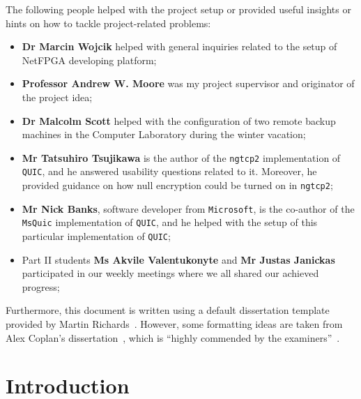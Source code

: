 \documentclass[12pt,a4paper,twoside,openright]{report}
\begin{document}
The following people helped with the project setup or provided useful insights or hints on how to tackle project-related problems:
\begin{itemize}
    \item \textbf{Dr Marcin Wojcik} helped with general inquiries related to the setup of NetFPGA developing platform;
    \item \textbf{Professor Andrew W. Moore} was my project supervisor and originator of the project idea;
    \item \textbf{Dr Malcolm Scott} helped with the configuration of two remote backup machines in the Computer Laboratory during the winter vacation;
    \item \textbf{Mr Tatsuhiro Tsujikawa} is the author of the \texttt{ngtcp2} implementation of \texttt{QUIC}, and he answered usability questions related to it. Moreover, he provided guidance on how null encryption could be turned on in \texttt{ngtcp2};
    \item \textbf{Mr Nick Banks}, software developer from \texttt{Microsoft}, is the co-author of the \texttt{MsQuic} implementation of \texttt{QUIC}, and he helped with the setup of this particular implementation of \texttt{QUIC};
    \item Part II students \textbf{Ms Akvile Valentukonyte} and \textbf{Mr Justas Janickas} participated in our weekly meetings where we all shared our achieved progress;
\end{itemize}

Furthermore, this document is written using a default dissertation template provided by Martin Richards~\cite{how_to_write_a_dissertation_in_LATEX}.
However, some formatting ideas are taken from Alex Coplan's dissertation~\cite{Alex_Coplan_dissertation}, which is \enquote{highly commended by the examiners}~\cite{Computer_Lab_dissertations}.


\pagestyle{headings}

\chapter{Introduction}

%
\end{document}
